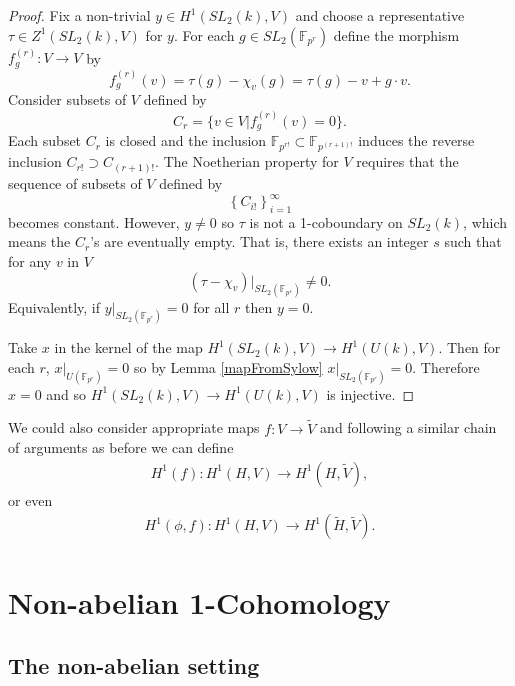 \begin{proof}
	Fix a non-trivial $y\in H^1(SL_2(k), V)$ and choose a representative $\tau\in Z^1(SL_2(k), V)$ for $y$. For each $g\in SL_2(\mathbb{F}_{p^r})$ define the morphism $f^{(r)}_g:V\rightarrow V$ by
	\begin{displaymath}
		f^{(r)}_g(v) = \tau(g) - \chi_v(g) = \tau(g) - v + g\cdot v.
	\end{displaymath}
	Consider subsets of $V$ defined by
	\begin{displaymath}
		C_r = \{v \in V | f^{(r)}_g(v) = 0\}.
	\end{displaymath}
	Each subset $C_r$ is closed and the inclusion $\mathbb{F}_{p^{r!}} \subset \mathbb{F}_{p^{(r+1)!}}$ induces the reverse inclusion $C_{r!} \supset C_{(r+1)!}$. The Noetherian property for $V$ requires that the sequence of subsets of $V$ defined by
	\begin{displaymath}
		\left\{C_{i!}\right\}_{i = 1}^\infty
	\end{displaymath}
	becomes constant. However, $y\neq 0$ so $\tau$ is not a 1-coboundary on $SL_2(k)$, which means the $C_r$'s are eventually empty. That is, there exists an integer $s$ such that for any $v$ in $V$
	\begin{displaymath}
		(\tau - \chi_v)|_{SL_2(\mathbb{F}_{p^s})} \neq 0.
	\end{displaymath}
	Equivalently, if $y|_{SL_2(\mathbb{F}_{p^r})} = 0$ for all $r$ then $y = 0$.
	
	Take $x$ in the kernel of the map $H^1(SL_2(k), V) \rightarrow H^1(U(k), V)$. Then for each $r$, $x|_{U(\mathbb{F}_{p^r})} = 0$ so by Lemma \ref{mapFromSylow} $x|_{SL_2(\mathbb{F}_{p^r})} = 0$. Therefore $x=0$ and so $H^1(SL_2(k), V) \rightarrow H^1(U(k), V)$ is injective.
\end{proof}

We could also consider appropriate maps $f:V\rightarrow\tilde{V}$ and following a similar chain of arguments as before we can define
\begin{eqnarray*}
	H^1(f):H^1(H, V)\rightarrow H^1(H, \tilde{V}),
\end{eqnarray*}
or even	
\begin{eqnarray*}
	H^1(\phi, f):H^1(H, V)\rightarrow H^1(\tilde{H}, \tilde{V}).
\end{eqnarray*}

\section{Non-abelian 1-Cohomology}
	
\subsection{The non-abelian setting}

